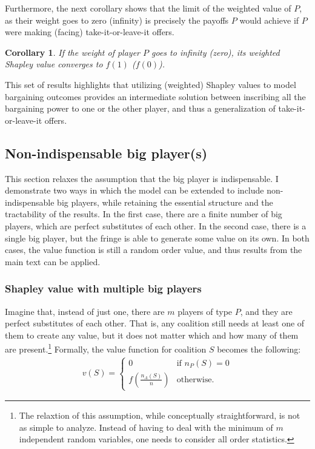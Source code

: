 \documentclass[a4paper]{article}
\newtheorem{corollary}{Corollary}
\begin{document}
Furthermore, the next corollary shows that the limit of the weighted value of $P$, as their weight goes to zero (infinity) is precisely the payoffs $P$ would achieve if $P$ were making (facing) take-it-or-leave-it offers.
\begin{corollary}
    \label{cor:paltform_value_weighted_2}
    If the weight of player $P$ goes to infinity (zero), its weighted Shapley value converges to $f(1)$ ($f(0)$).
\end{corollary}
This set of results highlights that utilizing (weighted) Shapley values to model bargaining outcomes provides an intermediate solution between inscribing all the bargaining power to one or the other player, and thus a generalization of take-it-or-leave-it offers.



\subsection{Non-indispensable big player(s)}
\label{sec:extensions}

This section relaxes the assumption that the big player is indispensable.
I demonstrate two ways in which the model can be extended to include non-indispensable big players, while retaining the essential structure and the tractability of the results.
In the first case, there are a finite number of big players, which are perfect substitutes of each other.
In the second case, there is a single big player, but the fringe is able to generate some value on its own.
In both cases, the value function is still a random order value, and thus results from the main text can be applied. %

\subsubsection{Shapley value with multiple big players}

Imagine that, instead of just one, there are $m$ players of type $P$, and they are perfect substitutes of each other.
That is, any coalition still needs at least one of them to create any value, but it does not matter which and how many of them are present.\footnote{
    The relaxtion of this assumption, while conceptually straightforward, is not as simple to analyze.
    Instead of having to deal with the minimum of $m$ independent random variables, one needs to consider all order statistics.
}
Formally, the value function for coalition $S$ becomes the following:
\begin{align*}
    v(S) = \begin{cases}
        0                              & \text{if } n_P(S) = 0 \\
        f\left(\frac{n_A(S)}{n}\right) & \text{otherwise}.
    \end{cases}
\end{align*}
\end{document}

